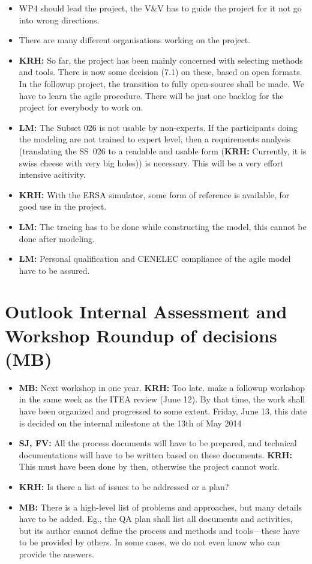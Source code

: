 \documentclass[a4paper,german]{article}
\begin{document}
\begin{itemize}
\item WP4 should lead the project, the V\&V has to guide the
project for it not go into wrong directions.
\item There are many different organisations working on the project.
\item \textbf{KRH:} So far, the project has been mainly concerned with
  selecting methods and tools. There is now some decision (7.1) on
  these, based on open formats. In the followup project, the
  transition to fully open-source shall be made. We have to learn the
  agile procedure. There will be just one backlog for the project for
  everybody to work on.
\item \textbf{LM:} The Subset 026 is not usable by non-experts. If the
  participants doing the modeling are not trained to expert level,
  then a requirements analysis (translating the SS~026 to a readable
  and usable form (\textbf{KRH:} Currently, it is swiss cheese with
  very big holes)) is necessary. This will be a very effort intensive
  acitivity.
\item \textbf{KRH:} With the ERSA simulator, some form of reference is
  available, for good use in the project.
\item \textbf{LM:} The tracing has to be done while constructing the
  model, this cannot be done after modeling.
\item \textbf{LM:} Personal qualification and CENELEC compliance of
  the agile model have to be assured. 
\end{itemize}

\section{Outlook Internal Assessment and Workshop Roundup of decisions (MB)}
\label{sec:outl-intern-assessm}

\begin{itemize}
\item \textbf{MB:} Next workshop in one year. \textbf{KRH:} Too
  late. make a followup workshop in the same week as the ITEA
  review (June 12). By that time, the work shall have been organized and
  progressed to some extent. Friday, June 13, this date is decided on the internal milestone at the 13th of May 2014
\item \textbf{SJ, FV:} All the process documents will have to be
  prepared, and technical documentations will have to be written based
  on these documents. \textbf{KRH:} This must have been done by then,
  otherwise the project cannot work.
\item \textbf{KRH:} Is there a list of issues to be addressed or a plan?
\item \textbf{MB:} There is a high-level list of problems and
  approaches, but many details have to be added. Eg., the QA plan
  shall list all documents and activities, but its author cannot
  define the process and methods and tools---these have to be provided
  by others. In some cases, we do not even know who can provide the
  answers. 
\end{itemize}
\end{document}
